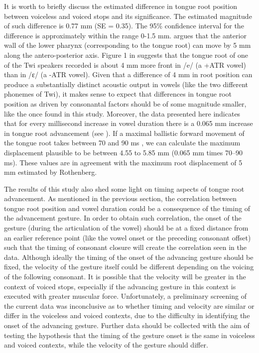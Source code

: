 \documentclass[12pt,]{article}
\begin{document}
It is worth to briefly discuss the estimated difference in tongue root
position between voiceless and voiced stops and its significance. The
estimated magnitude of such difference is 0.77 mm (SE = 0.35). The 95\%
confidence interval for the difference is approximately within the range
0-1.5 mm. \citet{rothenberg1967} argues that the anterior wall of the
lower pharynx (corresponding to the tongue root) can move by 5 mm along
the antero-posterior axis. Figure 1 in \citet{kirkham2017} suggests that
the tongue root of one of the Twi speakers recorded is about 4 mm more
front in /e/ (a +ATR vowel) than in /ɛ/ (a -ATR vowel). Given that a
difference of 4 mm in root position can produce a substantially distinct
acoustic output in vowels (like the two different phonemes of Twi), it
makes sense to expect that differences in tongue root position as driven
by consonantal factors should be of some magnitude smaller, like the
once found in this study. Moreover, the data presented here indicates
that for every millisecond increase in vowel duration there is a 0.065
mm increase in tongue root advancement (see ). If a
maximal ballistic forward movement of the tongue root takes between 70
and 90 ms \citep{rothenberg1967}, we can calculate the maximum
displacement plausible to be between 4.55 to 5.85 mm (0.065 mm times
70--90 ms). These values are in agreement with the maximum root
displacement of 5 mm estimated by Rothenberg.

The results of this study also shed some light on timing aspects of
tongue root advancement. As mentioned in the previous section, the
correlation between tongue root position and vowel duration could be a
consequence of the timing of the advancement gesture. In order to obtain
such correlation, the onset of the gesture (during the articulation of
the vowel) should be at a fixed distance from an earlier reference point
(like the vowel onset or the preceding consonant offset) such that the
timing of consonant closure will create the correlation seen in the
data. Although ideally the timing of the onset of the advancing gesture
should be fixed, the velocity of the gesture itself could be different
depending on the voicing of the following consonant. It is possible that
the velocity will be greater in the context of voiced stops, especially
if the advancing gesture in this context is executed with greater
muscular force. Unfortunately, a preliminary screening of the current
data was inconclusive as to whether timing and velocity are similar or
differ in the voiceless and voiced contexts, due to the difficulty in
identifying the onset of the advancing gesture. Further data should be
collected with the aim of testing the hypothesis that the timing of the
gesture onset is the same in voiceless and voiced contexts, while the
velocity of the gesture should differ.
\end{document}
